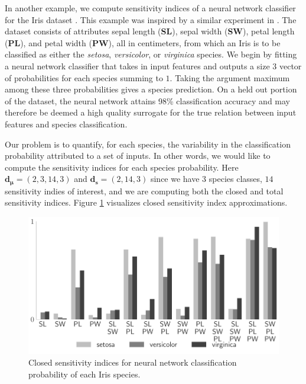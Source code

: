 \documentclass[graybox]{svmult}
\begin{document}
In another example, we compute sensitivity indices of a neural network classifier \cite{he2015delving} for the Iris dataset \cite{uci_ml_repo}. This example was inspired by a similar experiment in \cite{hoyt2021efficient}. The dataset consists of attributes sepal length (\textbf{SL}), sepal width (\textbf{SW}), petal length (\textbf{PL}), and petal width (\textbf{PW}), all in centimeters, from which an Iris is to be classified as either the \emph{setosa}, \emph{versicolor}, or \emph{virginica} species. We begin by fitting a neural network classifier that takes in input features and outputs a size $3$ vector of probabilities for each species summing to $1$. Taking the argument maximum among these three probabilities gives a species prediction. On a held out portion of the dataset, the neural network attains 98\% classification accuracy and may therefore be deemed a high quality surrogate for the true relation between input features and species classification. 

Our problem is to quantify, for each species, the variability in the classification probability attributed to a set of inputs. In other words, we would like to compute the sensitivity indices for each species probability. 
Here $\boldsymbol{d}_{\boldsymbol{\mu}} = (2,3,14,3)$ and $\boldsymbol{d}_{\boldsymbol{s}} = (2,14,3)$ since we have $3$ species classes, $14$ sensitivity indies of interest, and we are computing both the closed and total sensitivity indices. Figure \ref{SoRa_fig:nn_si} visualizes closed sensitivity index approximations. 
%

\begin{figure}[t]
    \centering
    \includegraphics[width=.8\textwidth]{figs/nn_si.pdf}
    \caption{Closed sensitivity indices for neural network classification probability of each Iris species.}
    \label{SoRa_fig:nn_si}
\end{figure}
\end{document}
